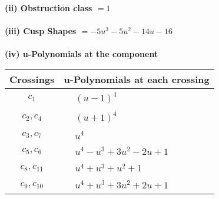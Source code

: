 \documentclass[1p]{elsarticle_modified}
\theoremstyle{definition}
\begin{document}
\flushleft \textbf{(ii) Obstruction class $= 1$}\\~\\
\flushleft \textbf{(iii) Cusp Shapes $= -5 u^3-5 u^2-14 u-16$}\\~\\
\newpage\renewcommand{\arraystretch}{1}
\flushleft \textbf{(iv) u-Polynomials at the component}\newline \\
\begin{tabular}{m{50pt}|m{274pt}}
Crossings & \hspace{64pt}u-Polynomials at each crossing \\
\hline $$\begin{aligned}c_{1}\end{aligned}$$&$\begin{aligned}
&(u-1)^4
\end{aligned}$\\
\hline $$\begin{aligned}c_{2},c_{4}\end{aligned}$$&$\begin{aligned}
&(u+1)^4
\end{aligned}$\\
\hline $$\begin{aligned}c_{3},c_{7}\end{aligned}$$&$\begin{aligned}
&u^4
\end{aligned}$\\
\hline $$\begin{aligned}c_{5},c_{6}\end{aligned}$$&$\begin{aligned}
&u^4- u^3+3 u^2-2 u+1
\end{aligned}$\\
\hline $$\begin{aligned}c_{8},c_{11}\end{aligned}$$&$\begin{aligned}
&u^4+u^3+u^2+1
\end{aligned}$\\
\hline $$\begin{aligned}c_{9},c_{10}\end{aligned}$$&$\begin{aligned}
&u^4+u^3+3 u^2+2 u+1
\end{aligned}$\\
\hline
\end{tabular}\\~\\
\end{document}
